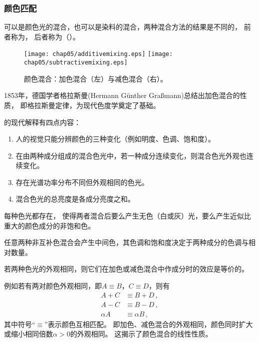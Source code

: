 \subsubsection*{颜色匹配}
可以是颜色光的混合，也可以是染料的混合，两种混合方法的结果是不同的，
前者称为，
后者称为（）。
\begin{figure}[htb]
      \centering
      \texttt{[image: chap05/additivemixing.eps]}
      \texttt{[image: chap05/subtractivemixing.eps]}
      \caption{颜色混合：加色混合（左）与减色混合（右）。}
      \label{fig:5.ex06}
\end{figure}

1853年，德国学者格拉斯曼(Hermann Günther Gra{\ss}mann)总结出加色混合的性质，
即格拉斯曼定律，为现代色度学奠定了基础。

\begin{proposition}
      的现代解释有四点内容：
      \begin{enumerate}
            \item 人的视觉只能分辨颜色的三种变化（例如明度、色调、饱和度）。
            \item 在由两种成分组成的混合色光中，若一种成分连续变化，则混合色光外观也连续变化。
            \item 存在光谱功率分布不同但外观相同的色光。
            \item 混合色光的总亮度是各成分亮度之和。
      \end{enumerate}
\end{proposition}
\begin{corollary}
      每种色光都存在，
      使得两者混合后要么产生无色（白或灰）光，要么产生近似比重大的颜色成分的非饱和色。
\end{corollary}
\begin{corollary}
      任意两种非互补色混合会产生中间色，其色调和饱和度决定于两种成分的色调与相对数量。
\end{corollary}
\begin{corollary}
      若两种色光的外观相同，则它们在加色或减色混合中作成分时的效应是等价的。
\end{corollary}

例如若有两对颜色外观相同，即$A\equiv B$，$C\equiv D$，则有
\begin{align}
      A+C      & \equiv B+D\, ,      \\
      A-C      & \equiv B-D\, ,      \\
      \alpha A & \equiv \alpha B\, ,
\end{align}
其中符号“$\equiv$”表示颜色互相匹配。
即加色、减色混合的外观相同，颜色同时扩大或缩小相同倍数$\alpha>0$的外观相同。
这揭示了颜色混合的线性性质。

